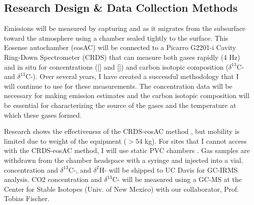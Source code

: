 	\subsection{Research Design \& Data Collection Methods}
	Emissions will be measured by capturing  and  as it migrates from the subsurface toward the atmosphere using a chamber sealed tightly to the surface. This Eosense autochamber (eosAC) will be connected to a Picarro G2201-i Cavity Ring-Down Spectrometer (CRDS) that can measure both gases rapidly (4 Hz) and in situ for concentrations ([] and []) and carbon isotopic composition ($\delta^{13}$C- and $\delta^{13}$C-). Over several years, I have created a successful methodology that I will continue to use for these measurements. The concentration data will be necessary for making emission estimates and the carbon isotopic composition will be essential for characterizing the source of the gases and the temperature at which these gases formed. 
	
	\vspace{3mm}  \par \noindent 	
	Research shows the effectiveness of the CRDS-eosAC method \citep{Christiansen2015a}, but mobility is limited due to weight of the equipment ($> 54$ kg). For sites that I cannot access with the CRDS-eosAC method, I will use static PVC chambers \citep{Livingston2006}. Gas samples are withdrawn from the chamber headspace with a syringe and injected into a vial.  concentration and $\delta^{13}$C-, and $\delta^{2}$H- will be shipped to UC Davis for GC-IRMS analysis. CO2 concentration and $\delta^{13}$C- will be measured using a GC-MS at the Center for Stable Isotopes (Univ. of New Mexico) with our collaborator, Prof. Tobias Fischer. 